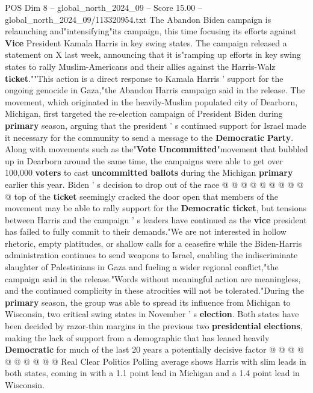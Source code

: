 \begin{textsample}{POS Dim 8 – global\_north\_2024\_09 – Score 15.00 – global\_north\_2024\_09/113320954.txt}  \label{ex:f8_pos_085}
The Abandon Biden campaign is relaunching and"intensifying"its campaign, this time focusing its efforts against \textbf{Vice} President Kamala Harris in key swing states.
The campaign released a statement on X last week, announcing that it is"ramping up efforts in key swing states to rally Muslim-Americans and their allies against the Harris-Walz \textbf{ticket}.""This action is a direct response to Kamala Harris ' support for the ongoing genocide in Gaza,"the Abandon Harris campaign said in the release.
The movement, which originated in the heavily-Muslim populated city of Dearborn, Michigan, first targeted the re-election campaign of President Biden during \textbf{primary} season, arguing that the president ' s continued support for Israel made it necessary for the community to send a message to the \textbf{Democratic} \textbf{Party}.
Along with movements such as the"\textbf{Vote} \textbf{Uncommitted}"movement that bubbled up in Dearborn around the same time, the campaigns were able to get over 100,000 \textbf{voters} to cast \textbf{uncommitted} \textbf{ballots} during the Michigan \textbf{primary} earlier this year.
Biden ' s decision to drop out of the race @ @ @ @ @ @ @ @ @ @ top of the \textbf{ticket} seemingly cracked the door open that members of the movement may be able to rally support for the \textbf{Democratic} \textbf{ticket}, but tensions between Harris and the campaign ' s leaders have continued as the \textbf{vice} president has failed to fully commit to their demands."We are not interested in hollow rhetoric, empty platitudes, or shallow calls for a ceasefire while the Biden-Harris administration continues to send weapons to Israel, enabling the indiscriminate slaughter of Palestinians in Gaza and fueling a wider regional conflict,"the campaign said in the release."Words without meaningful action are meaningless, and the continued complicity in these atrocities will not be tolerated."During the \textbf{primary} season, the group was able to spread its influence from Michigan to Wisconsin, two critical swing states in November ' s \textbf{election}.
Both states have been decided by razor-thin margins in the previous two \textbf{presidential} \textbf{elections}, making the lack of support from a demographic that has leaned heavily \textbf{Democratic} for much of the last 20 years a potentially decisive factor @ @ @ @ @ @ @ @ @ @ Real Clear Politics Polling average shows Harris with slim leads in both states, coming in with a 1.1 point lead in Michigan and a 1.4 point lead in Wisconsin.

\end{textsample}
